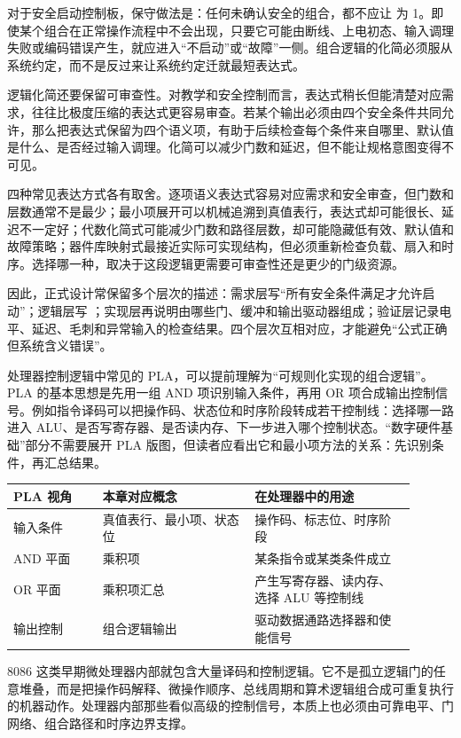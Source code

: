 对于安全启动控制板，保守做法是：任何未确认安全的组合，都不应让  为 1。即使某个组合在正常操作流程中不会出现，只要它可能由断线、上电初态、输入调理失败或编码错误产生，就应进入“不启动”或“故障”一侧。组合逻辑的化简必须服从系统约定，而不是反过来让系统约定迁就最短表达式。

逻辑化简还要保留可审查性。对教学和安全控制而言，表达式稍长但能清楚对应需求，往往比极度压缩的表达式更容易审查。若某个输出必须由四个安全条件共同允许，那么把表达式保留为四个语义项，有助于后续检查每个条件来自哪里、默认值是什么、是否经过输入调理。化简可以减少门数和延迟，但不能让规格意图变得不可见。

四种常见表达方式各有取舍。逐项语义表达式容易对应需求和安全审查，但门数和层数通常不是最少；最小项展开可以机械追溯到真值表行，表达式却可能很长、延迟不一定好；代数化简式可能减少门数和路径层数，却可能隐藏低有效、默认值和故障策略；器件库映射式最接近实际可实现结构，但必须重新检查负载、扇入和时序。选择哪一种，取决于这段逻辑更需要可审查性还是更少的门级资源。

因此，正式设计常保留多个层次的描述：需求层写“所有安全条件满足才允许启动”；逻辑层写 ；实现层再说明由哪些门、缓冲和输出驱动器组成；验证层记录电平、延迟、毛刺和异常输入的检查结果。四个层次互相对应，才能避免“公式正确但系统含义错误”。

处理器控制逻辑中常见的 PLA，可以提前理解为“可规则化实现的组合逻辑”。PLA 的基本思想是先用一组 AND 项识别输入条件，再用 OR 项合成输出控制信号。例如指令译码可以把操作码、状态位和时序阶段转成若干控制线：选择哪一路进入 ALU、是否写寄存器、是否读内存、下一步进入哪个控制状态。“数字硬件基础”部分不需要展开 PLA 版图，但读者应看出它和最小项方法的关系：先识别条件，再汇总结果。

\begin{longtable}{L{0.2\linewidth}L{0.34\linewidth}L{0.36\linewidth}}
\toprule
PLA 视角 & 本章对应概念 & 在处理器中的用途 \\
\midrule
输入条件 & 真值表行、最小项、状态位 & 操作码、标志位、时序阶段 \\\tablerowrule
AND 平面 & 乘积项 & 某条指令或某类条件成立 \\\tablerowrule
OR 平面 & 乘积项汇总 & 产生写寄存器、读内存、选择 ALU 等控制线 \\\tablerowrule
输出控制 & 组合逻辑输出 & 驱动数据通路选择器和使能信号 \\
\bottomrule
\end{longtable}

8086 这类早期微处理器内部就包含大量译码和控制逻辑。它不是孤立逻辑门的任意堆叠，而是把操作码解释、微操作顺序、总线周期和算术逻辑组合成可重复执行的机器动作。处理器内部那些看似高级的控制信号，本质上也必须由可靠电平、门网络、组合路径和时序边界支撑。


